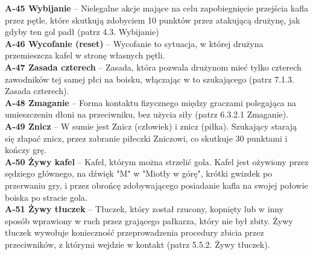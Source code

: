 \documentclass[11pt,a4paper]{article}
\begin{document}
\textbf{A-45 Wybijanie} – Nielegalne akcje mające na celu zapobiegnięcie przejścia kafla przez pętle, które skutkują zdobyciem 10 punktów przez atakującą drużynę, jak gdyby ten gol padł (patrz 4.3. Wybijanie)\\
\textbf{A-46 Wycofanie (reset)} – Wycofanie to sytuacja, w której drużyna przemieszcza kafel w stronę własnych pętli.\\
\textbf{A-47 Zasada czterech} – Zasada, która pozwala drużynom mieć tylko czterech zawodników tej samej płci na boisku, włączając w to szukającego (patrz 7.1.3. Zasada czterech).\\
\textbf{A-48 Zmaganie} – Forma kontaktu fizycznego między graczami polegająca na umieszczeniu dłoni na przeciwniku, bez użycia siły (patrz 6.3.2.1 Zmaganie).\\
\textbf{A-49 Znicz} – W sumie jest Znicz (człowiek) i znicz (piłka). Szukający starają się złapać znicz, przez zabranie piłeczki Zniczowi, co skutkuje 30 punktami i kończy grę.\\
\textbf{A-50 Żywy kafel} – Kafel, którym można strzelić gola. Kafel jest ożywiony przez sędziego głównego, na dźwięk "M" w "Miotły w górę", krótki gwizdek po przerwaniu gry, i przez obrońcę zdobywającego posiadanie kafla na swojej połowie boiska po stracie gola.\\
\textbf{A-51 Żywy tłuczek} – Tłuczek, który został rzucony, kopnięty lub w inny sposób wprawiony w ruch przez grającego pałkarza, który nie był zbity. Żywy tłuczek wywołuje konieczność przeprowadzenia procedury zbicia przez przeciwników, z którymi wejdzie w kontakt (patrz 5.5.2. Żywy tłuczek). \\

\newpage
{}

\end{document}
